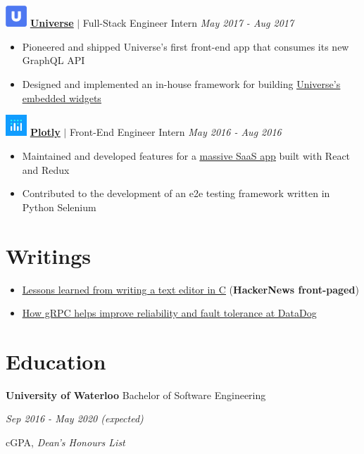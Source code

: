 \documentclass[paper=a4,fontsize=15pt]{scrartcl}
\newcommand{\quarterspace}{\vspace*{0.25em}}
\newcommand{\fullspace}{\vspace*{1em}}
\begin{document}
\fullspace
\noindent \includegraphics[width=0.8cm, height=0.8cm]{assets/universe.png}
\normalsize
\noindent \href{https://universe.com}{\ul{\textbf{Universe}}}
$\vert$ \small Full-Stack Engineer Intern
{\hfill \footnotesize \textit{May 2017 - Aug 2017}}
\begin{itemize}[noitemsep,leftmargin=20pt,label=\raisebox{0.25ex}{\tiny$\bullet$},topsep=5pt]
  \small
  \item Pioneered and shipped Universe's first front-end app that consumes its
    new GraphQL API
  \item Designed and implemented an in-house framework for building
    \href{https://www.universe.com/sell-tickets-on-your-website-with-universe-widgets}{\ul{Universe's
        embedded widgets}}
\end{itemize}

\fullspace
\noindent \includegraphics[width=0.8cm, height=0.8cm]{assets/plotly.png}
\normalsize
\noindent \href{https://plot.ly}{\textbf{\ul{Plotly}}}
$\vert$ \small Front-End Engineer Intern
{\hfill \footnotesize \textit{May 2016 - Aug 2016}}
\begin{itemize}[noitemsep,leftmargin=20pt,label=\raisebox{0.25ex}{\tiny$\bullet$},topsep=5pt]
  \small
  \item Maintained and developed features for a
    \href{https://plot.ly/online-chart-maker/}{\ul{massive SaaS app}} built with
    React and Redux
  \item Contributed to the development of an e2e testing framework written in
    Python Selenium
\end{itemize}

\section*{Writings}{}
\begin{itemize}[noitemsep,leftmargin=20pt,label=\raisebox{0.25ex}{\tiny$\bullet$},topsep=5pt]
  \small
  \item \href{http://lpan.io/what-i-learnt-from-viw}{\ul{Lessons learned from
        writing a text editor in C}} (\textbf{HackerNews front-paged})
  \item \href{http://lpan.io/migrating-to-grpc}{\ul{How gRPC helps improve
        reliability and fault tolerance at DataDog}}
\end{itemize}

\section*{Education}{}
\noindent \textbf{University of Waterloo} Bachelor of Software Engineering \par
\quarterspace
\footnotesize
\noindent \textit{Sep 2016 - May 2020 (expected)} \par
{} cGPA, \textit{Dean's Honours List}
\end{document}
